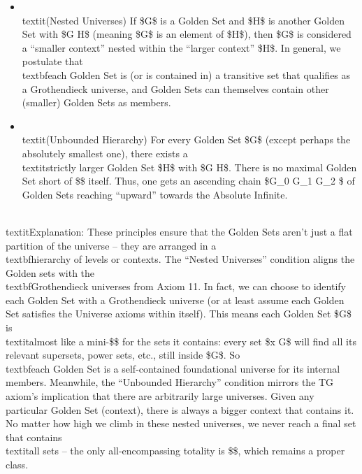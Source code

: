 \documentclass[11pt]{article}
\begin{document}
\begin{itemize}
  \item \\textit{(Nested Universes)} If \$G\$ is a Golden Set and \$H\$ is another Golden Set with \$G \in H\$ (meaning \$G\$ is an element of \$H\$), then \$G\$ is considered a “smaller context” nested within the “larger context” \$H\$. In general, we postulate that \\textbf{each Golden Set is (or is contained in) a transitive set that qualifies as a Grothendieck universe}, and Golden Sets can themselves contain other (smaller) Golden Sets as members.
  \item \\textit{(Unbounded Hierarchy)} For every Golden Set \$G\$ (except perhaps the absolutely smallest one), there exists a \\textit{strictly larger} Golden Set \$H\$ with \$G \in H\$. There is no maximal Golden Set short of \$\infty\$ itself. Thus, one gets an ascending chain \$G\_0 \in G\_1 \in G\_2 \in \cdots\$ of Golden Sets reaching “upward” towards the Absolute Infinite.

\end{itemize}
    \\textit{Explanation:} These principles ensure that the Golden Sets aren’t just a flat partition of the universe – they are arranged in a \\textbf{hierarchy of levels or contexts}. The “Nested Universes” condition aligns the Golden sets with the \\textbf{Grothendieck universes} from Axiom 11. In fact, we can choose to identify each Golden Set with a Grothendieck universe (or at least assume each Golden Set satisfies the Universe axioms within itself). This means each Golden Set \$G\$ is \\textit{almost} like a mini-\$\infty\$ for the sets it contains: every set \$x \in G\$ will find all its relevant supersets, power sets, etc., still inside \$G\$. So \\textbf{each Golden Set is a self-contained foundational universe} for its internal members. Meanwhile, the “Unbounded Hierarchy” condition mirrors the TG axiom’s implication that there are arbitrarily large universes. Given any particular Golden Set (context), there is always a bigger context that contains it. No matter how high we climb in these nested universes, we never reach a final set that contains \\textit{all} sets – the only all-encompassing totality is \$\infty\$, which remains a proper class.
\end{document}

